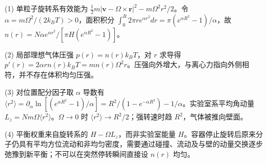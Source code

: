 (1) 单粒子旋转系有效能为 \(\tfrac12m|\mathbf v-\Omega\times\mathbf r|^2-m\Omega^2r^2/2\)。令 \(\alpha=m\Omega^2/(2k_BT)>0\)，面积积分 \(\int_0^R2\pi r e^{\alpha r^2}dr=\pi(e^{\alpha R^2}-1)/\alpha\)，故 \(n(r)=N\alpha e^{\alpha r^2}/[\pi H(e^{\alpha R^2}-1)]\)。

(2) 局部理想气体压强 \(p(r)=n(r)k_BT\)，对 \(r\) 求导得 \(p'(r)=2\alpha r n(r)k_BT=mn(r)\Omega^2r\)。压强向外增大，与离心力指向外侧相符，并不存在体积均匀压强。

(3) 对位置配分因子取 \(\alpha\) 导数有 \(\langle r^2\rangle=\partial_\alpha\ln[(e^{\alpha R^2}-1)/\alpha]=R^2/(1-e^{-\alpha R^2})-1/\alpha\)。实验室系平均角动量 \(L_z=Nm\Omega\langle r^2\rangle\)。\(\Omega\to0\) 时 \(\langle r^2\rangle\to R^2/2\)；强转速时趋 \(R^2\)，气体被推向壁面。

(4) 平衡权重来自旋转系的 \(H-\Omega L_z\)，而非实验室能量 \(H\)。容器停止旋转后原来分子仍具有平均方位流动和非均匀密度，需要通过碰撞、流动及与壁的动量交换逐步弛豫到新平衡；不可以在突然停转瞬间直接设 \(n(r)\) 均匀。
